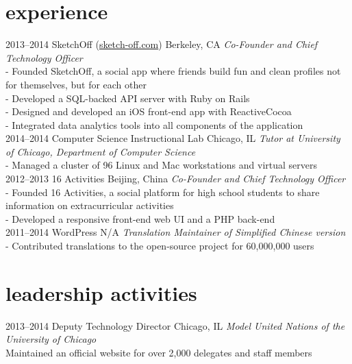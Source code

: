 \section{experience}

\begin{entrylist}
\entry
{2013--2014}
{SketchOff \quad\normalfont (\underline{sketch-off.com})}
{Berkeley, CA}
{\emph{Co-Founder and Chief Technology Officer} \\
- Founded SketchOff, a social app where friends build fun and clean profiles not for themselves, but for each other \\
- Developed a SQL-backed API server with Ruby on Rails \\
- Designed and developed an iOS front-end app with ReactiveCocoa \\
- Integrated data analytics tools into all components of the application \\ }
\entry
{2014--2014}
{Computer Science Instructional Lab}
{Chicago, IL}
{\emph{Tutor at University of Chicago, Department of Computer Science} \\
- Managed a cluster of 96 Linux and Mac workstations and virtual servers\\}
\entry
{2012--2013}
{16 Activities}
{Beijing, China}
{\emph{Co-Founder and Chief Technology Officer} \\
- Founded 16 Activities, a social platform for high school students to share information on extracurricular activities \\
- Developed a responsive front-end web UI and a PHP back-end \\}
\entry
{2011--2014}
{WordPress}
{N/A}
{\emph{Translation Maintainer of Simplified Chinese version} \\
-   Contributed translations to the open-source project for 60,000,000 users \\}
\end{entrylist}

\section{leadership activities}

\begin{entrylist}
\entry
{2013--2014}
{Deputy Technology Director}
{Chicago, IL}
{\emph{Model United Nations of the University of Chicago} \\
Maintained an official website for over 2,000 delegates and staff members \\}
\end{entrylist}

